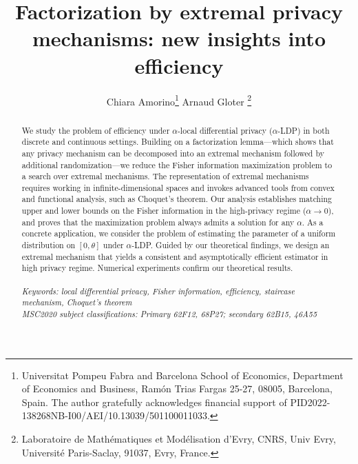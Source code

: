 \documentclass[a4paper, 11pt]{article}
\title{Factorization by extremal privacy mechanisms: new insights into efficiency}
\author{Chiara Amorino\thanks{ Universitat Pompeu Fabra and Barcelona School of Economics, Department of Economics and Business, Ram\'on Trias Fargas 25-27, 08005, Barcelona, Spain. The author gratefully acknowledges financial support of PID2022-138268NB-I00/AEI/10.13039/501100011033.} \qquad Arnaud Gloter \thanks{Laboratoire de Math\'ematiques et Mod\'elisation d'Evry, CNRS, Univ Evry, Universit\'e Paris-Saclay, 91037, Evry, France.}}
\theoremstyle{definition}
\begin{document}
\maketitle






\begin{abstract}
\noindent We study the problem of efficiency under $\alpha$-local differential privacy ($\alpha$-LDP) in both discrete and continuous settings. Building on a factorization lemma—which shows that any privacy mechanism can be decomposed into an extremal mechanism followed by additional randomization—we reduce the Fisher information maximization problem to a search over extremal mechanisms. The representation of extremal mechanisms requires working in infinite-dimensional spaces and invokes advanced tools from convex and functional analysis, such as Choquet’s theorem. Our analysis establishes matching upper and lower bounds on the Fisher information in the high-privacy regime ($\alpha \to 0$), and proves that the maximization problem always admits a solution for any $\alpha$.
As a concrete application, we consider the problem of estimating the parameter of a uniform distribution on $[0, \theta]$ under $\alpha$-LDP. Guided by our theoretical findings, we design an extremal mechanism that yields a consistent and asymptotically efficient estimator in high privacy regime. Numerical experiments confirm our theoretical results.
\\
\\
\noindent
 \textit{Keywords: local differential privacy, Fisher information, efficiency, staircase mechanism, Choquet's theorem} \\ 
 
\noindent
\textit{MSC2020 subject classifications: Primary 62F12, 68P27; secondary 62B15, 46A55}
\end{abstract}

\tableofcontents
\end{document}
